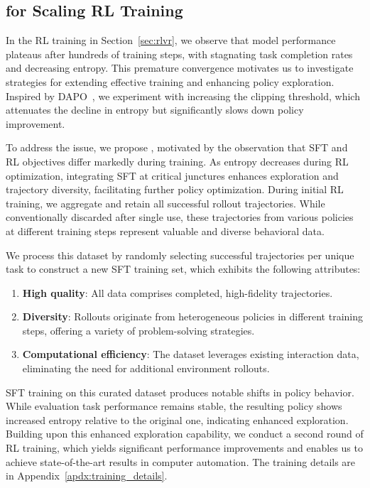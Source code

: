 \subsection{\rlmethod for Scaling RL Training}\label{sec:rewarm-rl}
In the RL training in Section~\ref{sec:rlvr}, we observe that model performance plateaus after hundreds of training steps, with stagnating task completion rates and decreasing entropy. This premature convergence motivates us to investigate strategies for extending effective training and enhancing policy exploration.
Inspired by DAPO~\citep{yu2025dapo}, we experiment with increasing the clipping threshold, which attenuates the decline in entropy but significantly slows down policy improvement.

To address the issue, we propose \rlmethod, motivated by the observation that SFT and RL objectives differ markedly during training. As entropy decreases during RL optimization, integrating SFT at critical junctures enhances exploration and trajectory diversity, facilitating further policy optimization.
During initial RL training, we aggregate and retain all successful rollout trajectories. While conventionally discarded after single use, these trajectories from various policies at different training steps represent valuable and diverse behavioral data.

We process this dataset by randomly selecting successful trajectories per unique task to construct a new SFT training set, which exhibits the following attributes:
\begin{enumerate}[leftmargin=1.5em,itemsep=0pt,parsep=0.2em,topsep=0.0em,partopsep=0.0em]
    \item \textbf{High quality}: All data comprises completed, high-fidelity trajectories.
    \item \textbf{Diversity}: Rollouts originate from heterogeneous policies in different training steps, offering a variety of problem-solving strategies.
    \item \textbf{Computational efficiency}: The dataset leverages existing interaction data, eliminating the need for additional environment rollouts.
\end{enumerate}

SFT training on this curated dataset produces notable shifts in policy behavior. While evaluation task performance remains stable, the resulting policy shows increased entropy relative to the original one, indicating enhanced exploration.
Building upon this enhanced exploration capability, we conduct a second round of RL training, which yields significant performance improvements and enables us to achieve state-of-the-art results in computer automation.
The training details are in Appendix~\ref{apdx:training_details}.


